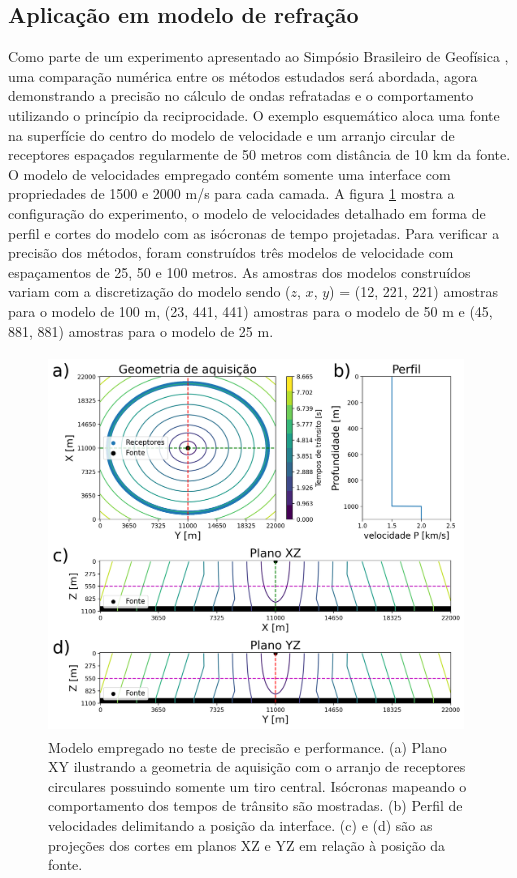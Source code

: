 \subsection{Aplicação em modelo de refração}

Como parte de um experimento apresentado ao Simpósio Brasileiro de Geofísica \cite{alves2022refraction}, uma comparação numérica entre os métodos estudados será abordada, agora demonstrando a precisão no cálculo de ondas refratadas e o comportamento utilizando o princípio da reciprocidade. O exemplo esquemático aloca uma fonte na superfície do centro do modelo de velocidade e um arranjo circular de receptores espaçados regularmente de 50 metros com distância de 10 km da fonte. O modelo de velocidades empregado contém somente uma interface com propriedades de 1500 e 2000 m/s para cada camada. A figura \ref{fig:configurationNumericalComparison} mostra a configuração do experimento, o modelo de velocidades detalhado em forma de perfil e cortes do modelo com as isócronas de tempo projetadas. Para verificar a precisão dos métodos, foram construídos três modelos de velocidade com espaçamentos de 25, 50 e 100 metros.  
As amostras dos modelos construídos variam com a discretização do modelo sendo ($z$, $x$, $y$) = (12, 221, 221) amostras para o modelo de 100 m, (23, 441, 441) amostras para o modelo de 50 m e (45, 881, 881) amostras para o modelo de 25 m.

\begin{figure}[H]
	\centering
	\includegraphics[width = 11cm, height = 10cm]{Imgs/RevisaoBibliografica/modelGeometry.png}
	\caption{Modelo empregado no teste de precisão e performance. (a) Plano XY ilustrando a geometria de aquisição com o arranjo de receptores circulares possuindo somente um tiro central. Isócronas mapeando o comportamento dos tempos de trânsito são mostradas. (b) Perfil de velocidades delimitando a posição da interface. (c) e (d) são as projeções dos cortes em planos XZ e YZ em relação à posição da fonte.}
	\label{fig:configurationNumericalComparison}
\end{figure}

